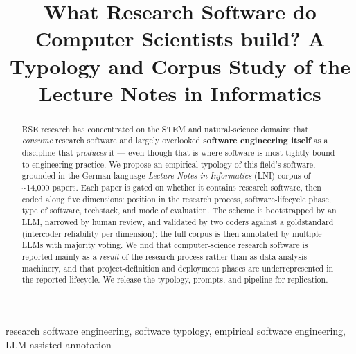 \documentclass[
  conference]{IEEEtran}
\title{What Research Software do Computer Scientists build? A Typology
and Corpus Study of the Lecture Notes in Informatics}
\author{}
\date{}
\begin{document}
\maketitle
\begin{abstract}
RSE research has concentrated on the STEM and natural-science domains
that \emph{consume} research software and largely overlooked
\textbf{software engineering itself} as a discipline that
\emph{produces} it --- even though that is where software is most
tightly bound to engineering practice. We propose an empirical typology
of this field's software, grounded in the German-language \emph{Lecture
Notes in Informatics} (LNI) corpus of \textasciitilde14,000 papers. Each
paper is gated on whether it contains research software, then coded
along five dimensions: position in the research process,
software-lifecycle phase, type of software, techstack, and mode of
evaluation. The scheme is bootstrapped by an LLM, narrowed by human
review, and validated by two coders against a goldstandard (intercoder
reliability per dimension); the full corpus is then annotated by
multiple LLMs with majority voting. We find that computer-science
research software is reported mainly as a \emph{result} of the research
process rather than as data-analysis machinery, and that
project-definition and deployment phases are underrepresented in the
reported lifecycle. We release the typology, prompts, and pipeline for
replication.
\end{abstract}


research software engineering, software typology, empirical software
engineering, LLM-assisted annotation
\end{document}
